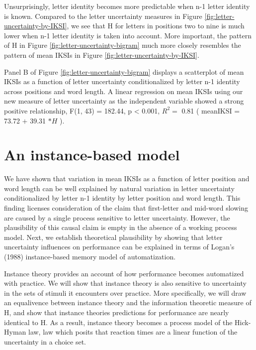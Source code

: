 \documentclass[,man,donotrepeattitle,floatsintext]{apa6}
\begin{document}
Unsurprisingly, letter identity becomes more predictable when n-1 letter identity is known. Compared to the letter uncertainty measures in Figure \ref{fig:letter-uncertainty-by-IKSI}, we see that H for letters in positions two to nine is much lower when n-1 letter identity is taken into account. More important, the pattern of H in Figure \ref{fig:letter-uncertainty-bigram} much more closely resembles the pattern of mean IKSIs in Figure \ref{fig:letter-uncertainty-by-IKSI}.

Panel B of Figure \ref{fig:letter-uncertainty-bigram} displays a scatterplot of mean IKSIs as a function of letter uncertainty conditionalized by letter n-1 identity across positions and word length. A linear regression on mean IKSIs using our new measure of letter uncertainty as the independent variable showed a strong positive relationship, F(1, 43) = 182.44, p \textless{} 0.001, \(R^2 =\) 0.81 ( meanIKSI = 73.72 \(+\) 39.31 \(* H\) ).

\hypertarget{an-instance-based-model}{%
\section{An instance-based model}\label{an-instance-based-model}}

We have shown that variation in mean IKSIs as a function of letter position and word length can be well explained by natural variation in letter uncertainty conditionalized by letter n-1 identity by letter position and word length. This finding licenses consideration of the claim that first-letter and mid-word slowing are caused by a single process sensitive to letter uncertainty. However, the plausibility of this causal claim is empty in the absence of a working process model. Next, we establish theoretical plausibility by showing that letter uncertainty influences on performance can be explained in terms of Logan's (1988) instance-based memory model of automatization.

Instance theory provides an account of how performance becomes automatized with practice. We will show that instance theory is also sensitive to uncertainty in the sets of stimuli it encounters over practice. More specifically, we will draw an equalivence between instance theory and the information theoretic measure of H, and show that instance theories predictions for performance are nearly identical to H. As a result, instance theory becomes a process model of the Hick-Hyman law, law which posits that reaction times are a linear function of the uncertainty in a choice set.
\end{document}

